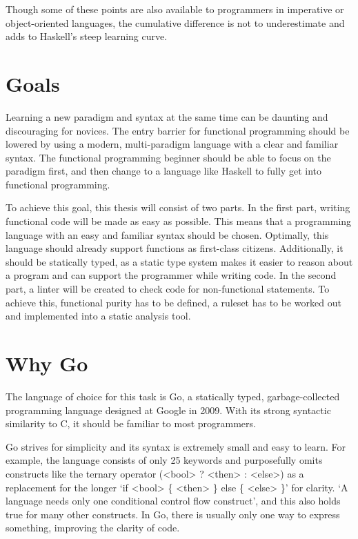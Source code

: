 Though some of these points are also available to programmers in imperative or object-oriented languages, the cumulative difference
is not to underestimate and adds to Haskell's steep learning curve.

\section{Goals}

Learning a new paradigm and syntax at the same time can be daunting and discouraging for novices.
The entry barrier for functional programming should be lowered by
using a modern, multi-paradigm language with a clear and familiar syntax. The functional
programming beginner should be able to focus on the paradigm first, and then change to a language
like Haskell to fully get into functional programming.

To achieve this goal, this thesis will consist of two parts.
In the first part, writing functional code will be made as easy as possible. This means that
a programming language with an easy and familiar syntax should be chosen. Optimally, this language
should already support functions as first-class citizens. Additionally, it should be statically
typed, as a static type system makes it easier to reason about a program and can support the
programmer while writing code.
In the second part, a linter will be created to check code for non-functional statements. To achieve
this, functional purity has to be defined, a ruleset has to be worked out and implemented into
a static analysis tool.

\section{Why Go}\label{sec:why-go}

The language of choice for this task is Go, a statically typed, garbage-collected programming language
designed at Google in 2009\autocite{golang-publish}. With its strong syntactic similarity to C, it should
be familiar to most programmers.

Go strives for simplicity and its syntax is extremely small and easy to learn. For example, the
language consists of only 25 keywords and purposefully omits constructs like the ternary operator
(<bool> ? <then> : <else>) as a replacement for the longer `if <bool> \{ <then> \} else \{ <else> \}'
for clarity. `A language needs only one conditional control flow construct'\autocite{go-ternary},
and this also holds true for many other constructs. In Go, there is usually only one way
to express something, improving the clarity of code.

